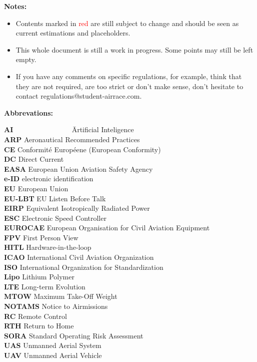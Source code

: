 \documentclass{article}
\begin{document}
\newpage
{\bf Notes:
\begin{itemize}
  \item Contents marked in \textcolor{red}{red} are still subject to change and should be seen as current estimations and placeholders.
  \item This whole document is still a work in progress. Some points may still be left empty.
  \item If you have any comments on specific regulations, for example, think that they are not required, are too strict or don't make sense, don't hesitate to contact regulations@student-airrace.com.
\end{itemize}
}
\hspace{10mm}

{\bf Abbrevations:}
\begin{tabbing}
  {\bf AI~~~~~~~~~~~~~~} \= Artificial Inteligence
  \\{\bf ARP} \> Aeronautical Recommended Practices
  \\{\bf CE} \> Conformité Européene (European Conformity)
  \\{\bf DC} \> Direct Current
  \\{\bf EASA} \> European Union Aviation Safety Agency
  \\{\bf e-ID} \> electronic identification
  \\{\bf EU} \> European Union
  \\{\bf EU-LBT} \> EU Listen Before Talk
  \\{\bf EIRP} \> Equivalent Isotropically Radiated Power
  \\{\bf ESC} \> Electronic Speed Controller
  \\{\bf EUROCAE} \> European Organisation for Civil Aviation Equipment
  \\{\bf FPV} \> First Person View
  \\{\bf HITL} \> Hardware-in-the-loop
  \\{\bf ICAO} \> International Civil Aviation Organization
  \\{\bf ISO} \> International Organization for Standardization
  \\{\bf Lipo} \> Lithium Polymer
  \\{\bf LTE} \> Long-term Evolution
  \\{\bf MTOW} \> Maximum Take-Off Weight
  \\{\bf NOTAMS} \> Notice to Airmissions
  \\{\bf RC} \> Remote Control
  \\{\bf RTH} \> Return to Home
  \\{\bf SORA} \> Standard Operating Risk Assessment
  \\{\bf UAS} \> Unmanned Aerial System
  \\{\bf UAV} \> Unmanned Aerial Vehicle
\end{tabbing}
\end{document}
